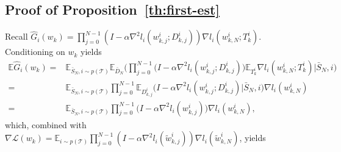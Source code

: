 \documentclass{osudissert96}
\begin{document}
\subsection*{Proof of Proposition~\ref{th:first-est}}
	Recall {\small $\widehat G_i(w_k)=  \prod_{j=0}^{N-1}(I - \alpha \nabla^2 l_i(w_{k,j}^i; D_{k,j}^i))\nabla l_i(w_{k,N}^i; T^i_k).$}
	Conditioning on $w_k$ yields
	{\small\begin{align}\label{gmeans}
	\mathbb{E} \widehat G_i(w_k) =& \mathbb{E}_{\bar S_N, i\sim p(\mathcal{T})} \mathbb{E}_{\bar D_N}\Big(  \prod_{j=0}^{N-1}  \big(I - \alpha \nabla^2 l_i(w_{k,j}^i; D_{k,j}^i)\big) \mathbb{E}_{T_k^i} \nabla l_i(w_{k,N}^i;  T_k^i) \big | \bar S_N, i  \Big) \nonumber
	\\ = & \mathbb{E}_{\bar S_N, i\sim p(\mathcal{T})}   \prod_{j=0}^{N-1}  \mathbb{E}_{D_{k,j}^i}\big(I - \alpha \nabla^2 l_i(w_{k,j}^i; D_{k,j}^i)\big |\bar  S_N, i \big)  \nabla l_i(w_{k,N}^i)     \nonumber
	\\ = &  \mathbb{E}_{\bar S_N, i\sim p(\mathcal{T})}  \prod_{j=0}^{N-1}  \big(I - \alpha \nabla^2 l_i(w_{k,j}^i)\big)  \nabla l_i(w_{k,N}^i)    ,
	\end{align}} %
	\hspace{-0.23cm}which, combined with {\small $\nabla \mathcal{L}(w_k)  =\mathbb{E}_{i\sim p(\mathcal{T})} \prod_{j=0}^{N-1}(I-\alpha \nabla^2 l_i(\widetilde w^i_{k,j}))\nabla l_i(\widetilde w^i _{k,N})$}, yields
\end{document}
